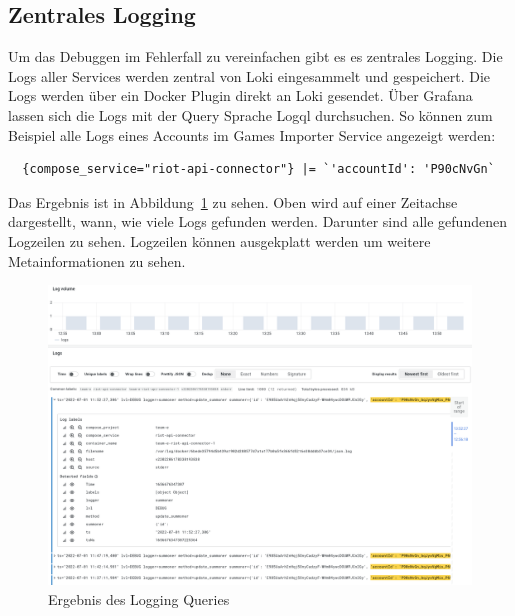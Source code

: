 \subsection{Zentrales Logging}

Um das Debuggen im Fehlerfall zu vereinfachen gibt es es zentrales Logging.
Die Logs aller Services werden zentral von Loki eingesammelt und gespeichert.
Die Logs werden über ein Docker Plugin direkt an Loki gesendet.
Über Grafana lassen sich die Logs mit der Query Sprache Logql durchsuchen.
So können zum Beispiel alle Logs eines Accounts im Games Importer Service angezeigt werden:

\begin{lstlisting}
  {compose_service="riot-api-connector"} |= `'accountId': 'P90cNvGn`
\end{lstlisting}

Das Ergebnis ist in Abbildung~\ref{fig:logging} zu sehen.
Oben wird auf einer Zeitachse dargestellt, wann, wie viele Logs gefunden werden.
Darunter sind alle gefundenen Logzeilen zu sehen.
Logzeilen können ausgekplatt werden um weitere Metainformationen zu sehen.

\begin{figure}
    \centering
    \includegraphics[width=\textwidth]{images/logging}
    \caption{Ergebnis des Logging Queries}
    \label{fig:logging}
\end{figure}